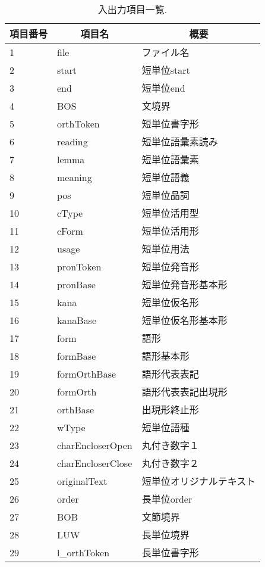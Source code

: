 \documentclass[titlepage]{jarticle}
\begin{document}
\begin{table}[!ht]
\small
\begin{center}
\caption{入出力項目一覧.}
\begin{tabular}{|l|l|l|}
\hline
\multicolumn{1}{|c|}{項目番号} & \multicolumn{1}{c}{項目名} & \multicolumn{1}{|c|}{概要} \\ \hline
1 & file & ファイル名 \\ \hline
2 & start & 短単位start \\ \hline
3 & end & 短単位end \\ \hline
4 & BOS & 文境界 \\ \hline
5 & orthToken & 短単位書字形 \\ \hline
6 & reading & 短単位語彙素読み \\ \hline
7 & lemma & 短単位語彙素 \\ \hline
8 & meaning & 短単位語義 \\ \hline
9 & pos & 短単位品詞 \\ \hline
10 & cType & 短単位活用型 \\ \hline
11 & cForm & 短単位活用形 \\ \hline
12 & usage & 短単位用法 \\ \hline
13 & pronToken & 短単位発音形 \\ \hline
14 & pronBase & 短単位発音形基本形 \\ \hline
15 & kana & 短単位仮名形 \\ \hline
16 & kanaBase & 短単位仮名形基本形 \\ \hline
17 & form & 語形 \\ \hline
18 & formBase & 語形基本形 \\ \hline
19 & formOrthBase & 語形代表表記 \\ \hline
20 & formOrth & 語形代表表記出現形 \\ \hline
21 & orthBase & 出現形終止形 \\ \hline
22 & wType & 短単位語種 \\ \hline
23 & charEncloserOpen & 丸付き数字１ \\ \hline
24 & charEncloserClose & 丸付き数字２ \\ \hline
25 & originalText & 短単位オリジナルテキスト \\ \hline
26 & order & 長単位order \\ \hline
27 & BOB & 文節境界 \\ \hline
28 & LUW & 長単位境界 \\ \hline
29 & l\_orthToken & 長単位書字形 \\ \hline

\end{tabular}
\end{center}
\end{table}
\end{document}
